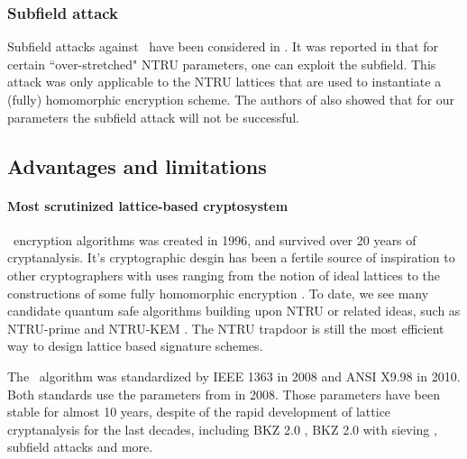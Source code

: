 \documentclass{llncs}
\newcommand{\ntru}{{\sf{NTRU}}}
\newcommand{\<}{\langle}
\renewcommand{\>}{\rangle}
\begin{document}
\subsubsection{Subfield attack}
Subfield attacks against \ntru~have been considered in \cite{subfielddjb}.
It was reported in \cite{DBLP:conf/crypto/AlbrechtBD16} that for certain ``over-stretched" NTRU parameters, one can exploit the subfield. This attack was only applicable to the NTRU lattices that are used
to instantiate a (fully) homomorphic encryption scheme. The authors of
 also \cite{DBLP:conf/crypto/AlbrechtBD16}
showed that for our parameters the subfield attack will not be successful.





\subsection{Advantages and limitations}
\paragraph{Most scrutinized lattice-based cryptosystem}
\ntru~encryption algorithms was created in 1996, and survived over 20 years
of cryptanalysis. 
It's cryptographic desgin has been a fertile source of inspiration to other cryptographers with uses ranging from the notion of ideal lattices 
\cite{DBLP:journals/cc/Micciancio07} to
the constructions of some fully homomorphic encryption \cite{DBLP:conf/stoc/Gentry09,ltv13}.
To date, we see many candidate quantum safe algorithms building upon NTRU or
related ideas, such as NTRU-prime \cite{DBLP:journals/iacr/BernsteinCLV16} and
NTRU-KEM \cite{DBLP:conf/ches/HulsingRSS17}. The NTRU trapdoor is still the most efficient way to design lattice based signature schemes.


The \ntru~algorithm was standardized by IEEE 1363 \cite{ieee1363_1} in 2008 and ANSI X9.98 \cite{x998} in 2010. Both standards use the parameters from \cite{params08} in 2008. Those
parameters have been stable for almost 10 years, despite of the rapid
development of lattice cryptanalysis for the last decades, including
BKZ 2.0 \cite{BKZ2}, BKZ 2.0 with sieving \cite{newhope}, subfield
attacks \cite{subfielddjb,subfieldabd,subfieldcjl,subfieldkf} and more. 
\end{document}
